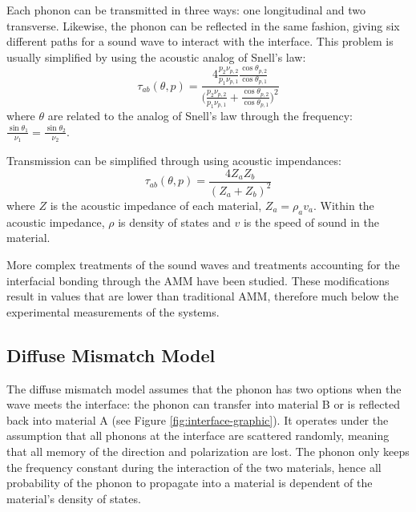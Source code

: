 Each phonon can be transmitted in three ways: one longitudinal and two transverse. Likewise, the phonon can be reflected in the same fashion, giving six different paths for a sound wave to interact with the interface. This problem is usually simplified by using the acoustic analog of Snell’s law:
\begin{equation}
\tau_{ab}(\theta, p) = \frac{4\frac{p_2 \nu_{p, 2}}{p_1 \nu_{p,1}} \frac{\cos{\theta_{p,2}}}{\cos{\theta_{p,1}}}}{\big( \frac{p_2 \nu_{p, 2}}{p_1 \nu_{p,1}}+ \frac{\cos{\theta_{p,2}}}{\cos{\theta_{p,1}}}\big)^2}
\end{equation}
where $\theta$ are related to the analog of Snell's law through the frequency: \(\frac{\sin{\theta_1}}{\nu_1} = \frac{\sin{\theta_2}}{\nu_2}\).

Transmission can be simplified through using acoustic impendances:
\begin{equation}
\tau_{ab}(\theta, p) = \frac{4Z_a Z_b}{(Z_a +Z_b)^2}
\end{equation}
where $Z$ is the acoustic impedance of each material, $Z_a = \rho_a v_a$. Within the acoustic impedance, $\rho$ is density of states and $v$ is the speed of sound in the material. 

More complex treatments of the sound waves\cite{Prasher2000} and treatments accounting for the interfacial bonding\cite{Prasher2009} through the AMM have been studied. These modifications result in values that are lower than traditional AMM, therefore much below the experimental measurements of the systems.\cite{Cahill2006, Stoner1993}

\subsection{Diffuse Mismatch Model}
The diffuse mismatch model assumes that the phonon has two options when the wave meets the interface: the phonon can transfer into material B or is reflected back into material A (see Figure \ref{fig:interface-graphic}). It operates under the assumption that all phonons at the interface are scattered randomly, meaning that all memory of the direction and polarization are lost. The phonon only keeps the frequency constant during the interaction of the two materials, hence all probability of the phonon to propagate into a material is dependent of the material's density of states. 

